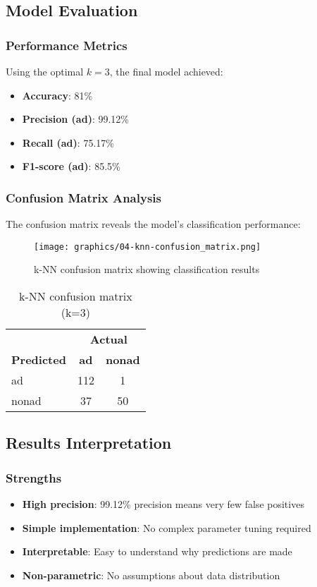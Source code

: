 \subsection{Model Evaluation}
\subsubsection{Performance Metrics}
Using the optimal $k = 3$, the final model achieved:

\begin{itemize}
    \item \textbf{Accuracy}: 81\%
    \item \textbf{Precision (ad)}: 99.12\%
    \item \textbf{Recall (ad)}: 75.17\%
    \item \textbf{F1-score (ad)}: 85.5\%
\end{itemize}

\subsubsection{Confusion Matrix Analysis}
The confusion matrix reveals the model's classification performance:

\begin{figure}[H]
\centering
\texttt{[image: graphics/04-knn-confusion\_matrix.png]}
\caption{k-NN confusion matrix showing classification results}
\label{fig:knn-confusion-matrix}
\end{figure}

\begin{table}[H]
\centering
\caption{k-NN confusion matrix (k=3)}
\label{tab:knn-confusion}
\begin{tabular}{lcc}
\toprule
 & \multicolumn{2}{c}{\textbf{Actual}} \\
\textbf{Predicted} & \textbf{ad} & \textbf{nonad} \\
\midrule
ad & 112 & 1 \\
nonad & 37 & 50 \\
\bottomrule
\end{tabular}
\end{table}

\subsection{Results Interpretation}
\subsubsection{Strengths}
\begin{itemize}
    \item \textbf{High precision}: 99.12\% precision means very few false positives
    \item \textbf{Simple implementation}: No complex parameter tuning required
    \item \textbf{Interpretable}: Easy to understand why predictions are made
    \item \textbf{Non-parametric}: No assumptions about data distribution
\end{itemize}

